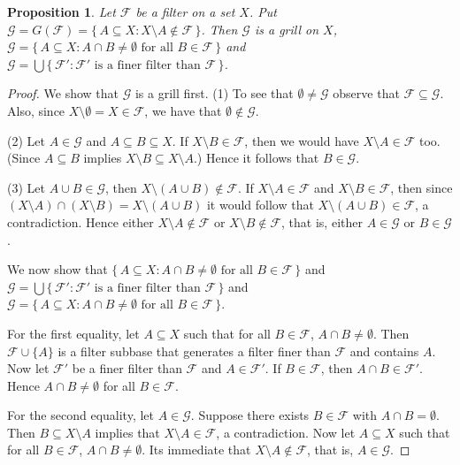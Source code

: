 \documentclass[12pt]{article}
\theoremstyle{plain}
\newtheorem{prop}[thm]{Proposition}
\theoremstyle{definition}
\newcommand{\calF}{\mathcal{F}}
\newcommand{\calG}{\mathcal{G}}
\begin{document}
\begin{prop}
  Let $\calF$ be a filter on a set $X$. 
  Put $\calG = G(\calF) = \{\, A \subseteq X : X \setminus A \not\in
  \calF \,\}$.
  Then $\calG$ is a grill on $X$, $\calG = \{\, A \subseteq X : A
  \cap B \ne \emptyset \mbox{ for all } B \in \calF \,\}$ and $\calG =
  \bigcup\{\, \calF' : \calF' \mbox{ is a finer filter than } \calF \,\}$.
\end{prop}
\begin{proof}
  We show that $\calG$ is a grill first.
  (1) To see that $\emptyset \ne \calG$ observe that $\calF \subseteq
  \calG$. 
  Also, since $X \setminus \emptyset = X \in \calF$, we have that
  $\emptyset \not\in \calG$.

  (2) Let $A \in \calG$ and $A \subseteq B \subseteq X$. 
  If $X \setminus B \in \calF$, then we would have $X \setminus A \in
  \calF$ too.
  (Since $A \subseteq B$ implies $X \setminus B \subseteq X \setminus
  A$.)
  Hence it follows that $B \in \calG$.

  (3) Let $A \cup B \in \calG$, then $X \setminus (A \cup B) \not\in
  \calF$.
  If $X \setminus A \in \calF$ and $X \setminus B \in \calF$, then
  since $(X \setminus A) \cap (X \setminus B) = X \setminus (A \cup
  B)$ it would follow that $X \setminus (A \cup B) \in \calF$, a
  contradiction.
  Hence either $X \setminus A \not\in \calF$ or $X \setminus B \not\in
  \calF$, that is, either $A \in \calG$ or $B \in \calG$.

  We now show that $\{\, A \subseteq X : A
  \cap B \ne \emptyset \mbox{ for all } B \in \calF \,\}$ and $\calG =
  \bigcup\{\, \calF' : \calF' \mbox{ is a finer filter than } \calF
  \,\}$ and $\calG = \{\, A \subseteq X : A
  \cap B \ne \emptyset \mbox{ for all } B \in \calF \,\}$.
  
  For the first equality, let $A \subseteq X$ such that for all $B \in
  \calF$, $A \cap B \ne \emptyset$. 
  Then $\calF \cup \{A\}$ is a filter subbase that generates a filter
  finer than $\calF$ and contains $A$.
  Now let $\calF'$ be a finer filter than $\calF$ and $A \in \calF'$.
  If $B \in \calF$, then $A \cap B \in \calF'$.
  Hence $A \cap B \ne \emptyset$ for all $B \in \calF$.

  For the second equality, let $A \in \calG$. 
  Suppose there exists $B \in \calF$ with $A \cap B = \emptyset$.
  Then $B \subseteq X \setminus A$ implies that $X \setminus A \in
  \calF$, a contradiction.
  Now let $A \subseteq X$ such that for all $B \in \calF$, $A \cap B
  \ne \emptyset$.
  Its immediate that $X \setminus A \not\in \calF$, that is, $A \in \calG$.  
\end{proof}
\end{document}
